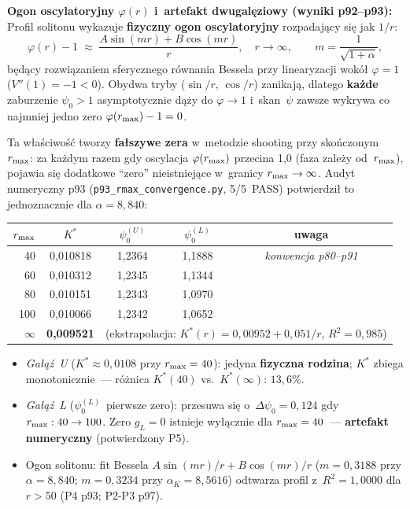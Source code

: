 \begin{remark}
\medskip\noindent
\textbf{Ogon oscylatoryjny $\varphi(r)$ i~artefakt dwugalęziowy (wyniki p92--p93):}
Profil solitonu wykazuje \textbf{fizyczny ogon oscylatoryjny} rozpadaj\k{a}cy si\k{e} jak $1/r$:
\begin{equation}\label{eq:osc-tail}
  \varphi(r) - 1 \;\approx\; \frac{A\sin(mr) + B\cos(mr)}{r}, \quad r\to\infty,
  \qquad m = \frac{1}{\sqrt{1+\alpha}},
\end{equation}
b\k{e}d\k{a}cy rozwi\k{a}zaniem sferycznego r\'ownania Bessela
przy linearyzacji wok\'o\l{} $\varphi=1$ ($V''(1) = -1 < 0$).
Obydwa tryby ($\sin/r$, $\cos/r$) zanikaj\k{a}, dlatego
\textbf{ka\.zde} zaburzenie $\psi_0 > 1$ asymptotycznie d\k{a}\.zy do $\varphi\to 1$
i~skan~$\psi$ zawsze wykrywa co najmniej jedno zero $\varphi(r_{\rm max})-1=0$.

Ta w\l{}a\'sciwo\'s\'c tworzy \textbf{fa\l{}szywe zera} w~metodzie shooting
przy sko\'nczonym $r_{\rm max}$: za ka\.zdym razem gdy oscylacja
$\varphi(r_{\rm max})$ przecina 1{,}0 (faza zale\.zy od~$r_{\rm max}$),
pojawia si\k{e} dodatkowe ``zero'' nieistniej\k{a}ce w~granicy $r_{\rm max}\to\infty$.
Audyt numeryczny p93 (\texttt{p93\_rmax\_convergence.py}, 5/5~PASS)
potwierdzi\l{} to jednoznacznie dla $\alpha=8{,}840$:

\begin{center}\small
\begin{tabular}{@{}rcccc@{}}
\toprule
$r_{\rm max}$ & $K^*$ & $\psi_0^{(U)}$ & $\psi_0^{(L)}$ & uwaga \\
\midrule
40  & 0{,}010818 & 1{,}2364 & 1{,}1888 & \emph{konwencja p80--p91} \\
60  & 0{,}010312 & 1{,}2345 & 1{,}1344 & \\
80  & 0{,}010151 & 1{,}2343 & 1{,}0970 & \\
100 & 0{,}010066 & 1{,}2342 & 1{,}0652 & \\
$\infty$ & \textbf{0{,}009521} & \multicolumn{3}{l}{(ekstrapolacja: $K^*(r)=0{,}00952+0{,}051/r$, $R^2=0{,}985$)} \\
\bottomrule
\end{tabular}
\end{center}

\begin{itemize}[nosep]
\item \emph{Ga\l{}\k{a}\'z~U} ($K^*\approx 0{,}0108$ przy $r_{\rm max}=40$):
  jedyna \textbf{fizyczna rodzina}; $K^*$ zbiega monotonicznie~---
  r\'o\.znica $K^*(40)$ vs.\ $K^*(\infty)$: $13{,}6\%$.
\item \emph{Ga\l{}\k{a}\'z~L} ($\psi_0^{(L)}$~pierwsze zero):
  przesuwa si\k{e} o~$\Delta\psi_0=0{,}124$ gdy $r_{\rm max}:40\to100$.
  Zero $g_L=0$ istnieje wy\l{}\k{a}cznie dla $r_{\rm max}=40$~---
  \textbf{artefakt numeryczny} (potwierdzony P5).
\item Ogon solitonu: fit Bessela $A\sin(mr)/r+B\cos(mr)/r$ ($m=0{,}3188$
  przy $\alpha=8{,}840$; $m=0{,}3234$ przy $\alpha_K=8{,}5616$)
  odtwarza profil z~$R^2=1{,}0000$ dla $r>50$ (P4 p93; P2-P3 p97).
\end{itemize}


\end{remark}
